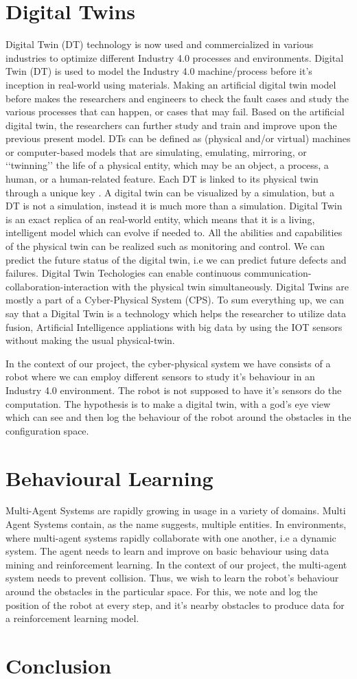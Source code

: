 \section{Digital Twins}
Digital Twin (DT) technology is now used and commercialized in various industries to optimize different Industry 4.0 processes and environments. 
Digital Twin (DT) is used to model the Industry 4.0 machine/process before it's inception in real-world using materials.
Making an artificial digital twin model before makes the researchers and engineers to check the fault cases and study the various processes that can happen, or cases that may fail.
Based on the artificial digital twin, the researchers can further study and train and improve upon the previous present model. DTs can be defined as (physical and/or virtual) machines
or computer-based models that are simulating, emulating,
mirroring, or ‘‘twinning’’ the life of a physical entity, which
may be an object, a process, a human, or a human-related feature. Each DT is linked to its physical twin through a unique
key \cite{8901113}. A digital twin can be visualized by a simulation, but a DT is not a simulation, instead it is much more than a simulation. Digital Twin is an exact replica of 
an real-world entity, which means that it is a living, intelligent model which can evolve if needed to. All the abilities and capabilities of the physical twin can be realized such as monitoring and control.
We can predict the future status of the digital twin, i.e we can predict future defects and failures. Digital Twin Techologies can enable continuous communication-collaboration-interaction with the 
physical twin simultaneously. Digital Twins are mostly a part of a Cyber-Physical System (CPS). To sum everything up, we can say that a Digital Twin is a technology which helps the researcher to 
utilize data fusion, Artificial Intelligence appliations with big data by using the IOT sensors without making the usual physical-twin.

In the context of our project, the cyber-physical system we have consists of a robot where we can employ different sensors to study it's behaviour in an Industry 4.0 environment. The robot is not supposed to have it's sensors do the computation.
The hypothesis is to make a digital twin, with a god's eye view which can see and then log the behaviour of the robot around the obstacles in the configuration space.

\section{Behavioural Learning}
Multi-Agent Systems are rapidly growing in usage in a variety of domains. Multi Agent Systems contain, as the name suggests, multiple entities. 
In environments, where multi-agent systems rapidly collaborate with one another, i.e a dynamic system. The agent needs to learn and improve on basic behaviour using data mining and reinforcement learning.
In the context of our project, the multi-agent system needs to prevent collision. Thus, we wish to learn the robot's behaviour around the obstacles in the particular space. For this, we note and log the position of the robot
at every step, and it's nearby obstacles to produce data for a reinforcement learning model.

\section{Conclusion}